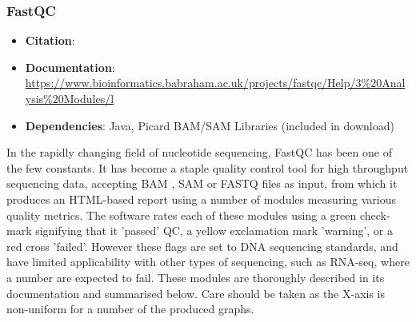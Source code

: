 \subsubsection{FastQC}
\begin{itemize}\itemsep-0.5em
\item[] \textbf{Citation}: 				\cite{andrews2010fastqc}
\item[] \textbf{Documentation}: 	\url{https://www.bioinformatics.babraham.ac.uk/projects/fastqc/Help/3\%20Analysis\%20Modules/l}
\item[] \textbf{Dependencies}: Java, Picard BAM/SAM Libraries (included in download)
\end{itemize}
In the rapidly changing field of nucleotide sequencing, FastQC has been one of the few constants. It has become a staple quality control tool for high throughput sequencing data, accepting BAM \citep{BAM}, SAM \citep{li2009sequence} or FASTQ files as input, from which it produces an HTML-based report using a number of modules measuring various quality metrics. The software rates each of these modules using a green check-mark signifying that it 'passed' QC, a yellow exclamation mark 'warning', or a red cross 'failed'. However these flags are set to DNA sequencing standards, and have limited applicability with other types of sequencing, such as RNA-seq, where a number are expected to fail. These modules are thoroughly described in its documentation and summarised below. Care should be taken as the X-axis is non-uniform for a number of the produced graphs.

